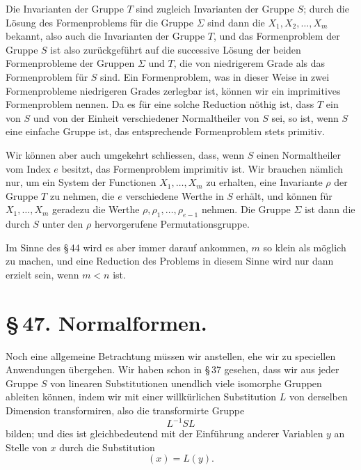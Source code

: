 \documentclass[11pt]{article}
\begin{document}
Die Invarianten der Gruppe $T$ sind zugleich Invarianten der Gruppe $S$; durch die Lösung des Formenproblems für die Gruppe $\Sigma$ sind dann die $X_1,X_2,\ldots,X_m$ bekannt, also auch die Invarianten der Gruppe $T$, und das Formenproblem der Gruppe $S$ ist also zurückgeführt auf die successive Lösung der beiden Formenprobleme der Gruppen $\Sigma$ und $T$, die von niedrigerem Grade als das Formenproblem für $S$ sind. Ein Formenproblem, was in dieser Weise in zwei Formenprobleme niedrigeren Grades zerlegbar ist, können wir ein imprimitives Formenproblem nennen. Da es für eine solche Reduction nöthig ist, dass $T$ ein von $S$ und von der Einheit verschiedener Normaltheiler von $S$ sei, so ist, wenn $S$ eine einfache Gruppe ist, das entsprechende Formenproblem stets primitiv.

Wir können aber auch umgekehrt schliessen, dass, wenn $S$ einen Normaltheiler vom Index $e$ besitzt, das Formenproblem imprimitiv ist. Wir brauchen nämlich nur, um ein System der Functionen $X_1,\ldots,X_m$ zu erhalten, eine Invariante $\rho$ der Gruppe $T$ zu nehmen, die $e$ verschiedene Werthe in $S$ erhält, und können für $X_1,\ldots,X_m$ geradezu die Werthe $\rho,\rho_1,\ldots,\rho_{e-1}$ nehmen. Die Gruppe $\Sigma$ ist dann die durch $S$ unter den $\rho$ hervorgerufene Permutationsgruppe.

Im Sinne des \S\,44 wird es aber immer darauf ankommen, $m$ so klein als möglich zu machen, und eine Reduction des Problems in diesem Sinne wird nur dann erzielt sein, wenn $m<n$ ist.

\section*{\S\,47. Normalformen.}

Noch eine allgemeine Betrachtung müssen wir anstellen, ehe wir zu speciellen Anwendungen übergehen. Wir haben schon in \S\,37 gesehen, dass wir aus jeder Gruppe $S$ von linearen Substitutionen unendlich viele isomorphe Gruppen ableiten können, indem wir mit einer willkürlichen Substitution $L$ von derselben Dimension transformiren, also die transformirte Gruppe
\begin{equation}
L^{-1}SL
\tag{1}
\end{equation}
bilden; und dies ist gleichbedeutend mit der Einführung anderer Variablen $y$ an Stelle von $x$ durch die Substitution
\begin{equation}
(x)=L(y).
\tag{2}
\end{equation}
\end{document}
